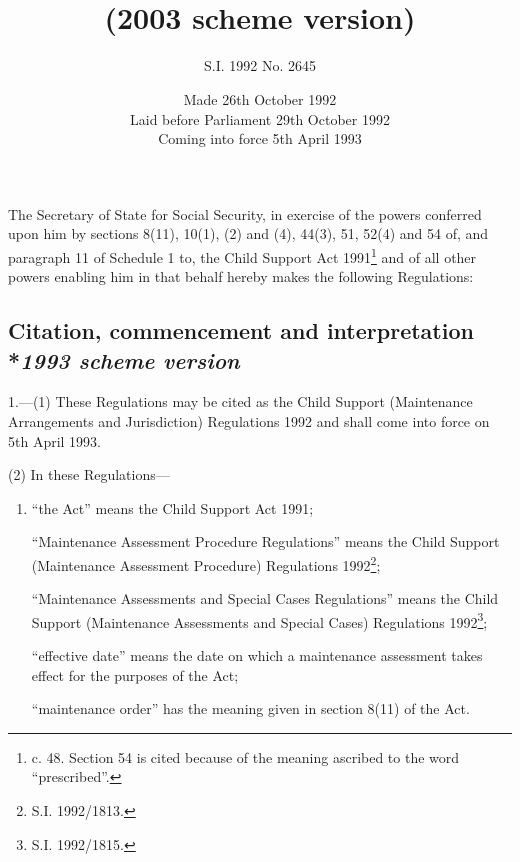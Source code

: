 \documentclass[12pt,a4paper]{article}
\title{\regstitle}
\title{\regstitle\\(2003 scheme version)}
\author{S.I. 1992 No. 2645}
\date{Made 26th October 1992\\Laid before Parliament 29th October 1992\\Coming into force 5th April 1993}
\begin{document}
\maketitle

\noindent
The Secretary of State for Social Security, in exercise of the powers conferred upon him by sections 8(11), 10(1), (2) and (4), 44(3), 51, 52(4) and 54 of, and paragraph 11 of Schedule 1 to, the Child Support Act 1991\footnote{ c. 48. Section 54 is cited because of the meaning ascribed to the word “prescribed”.} and of all other powers enabling him in that behalf hereby makes the following Regulations:


{\sloppy

\tableofcontents

}

\setcounter{secnumdepth}{-2}

\subsection[1. Citation, commencement and interpretation --- \emph{1993 scheme version}]{Citation, commencement and interpretation\\*\emph{1993 scheme version}}

1.—(1) These Regulations may be cited as the Child Support (Maintenance Arrangements and Jurisdiction) Regulations 1992 and shall come into force on 5th April 1993.

(2) In these Regulations—
\begin{enumerate}\item[]
“the Act” means the Child Support Act 1991;

“Maintenance Assessment Procedure Regulations” means the Child Support (Maintenance Assessment Procedure) Regulations 1992\footnote{\frenchspacing S.I. 1992/1813.};

“Maintenance Assessments and Special Cases Regulations” means the Child Support (Maintenance Assessments and Special Cases) Regulations 1992\footnote{\frenchspacing S.I. 1992/1815.};

“effective date” means the date on which a maintenance assessment takes effect for the purposes of the Act;

“maintenance order” has the meaning given in section 8(11) of the Act.
\end{enumerate}
\end{document}
